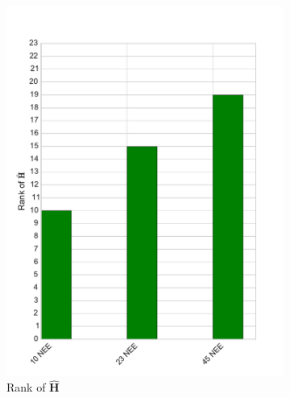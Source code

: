 \documentclass[11pt]{article}
\begin{document}
\begin{figure}[ht]
    \centering
    \begin{subfigure}[b]{0.4\textwidth}
        \includegraphics[width=\textwidth]{dalec2_obsrank.pdf}
        \caption{Rank of $\hat{\textbf{H}}$}
        \label{fig:D2_observabilityrank}
    \end{subfigure}%
    \begin{subfigure}[b]{0.4\textwidth}

\end{subfigure}
\end{figure}
\end{document}
